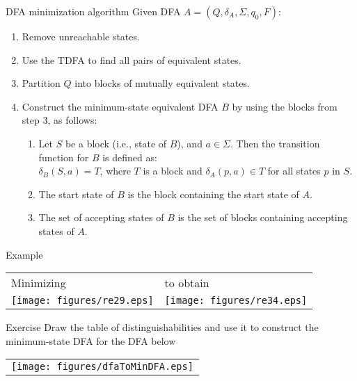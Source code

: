 \documentclass{prosper}%
\newcommand{\autom}[1]{$#1 = (Q, \delta, \Sigma, q_0, F)$}
\begin{document}
\begin{slide}{DFA minimization algorithm}
Given DFA $A=(Q, \delta_A, \Sigma, q_0, F)$:%
\begin{enumerate}
\item Remove unreachable states.
\item Use the TDFA to find all pairs of equivalent states.
\item Partition $Q$ into blocks of mutually equivalent states.
\item Construct the minimum-state equivalent DFA $B$ by using the blocks from step 3, as follows:
\begin{enumerate}
\item Let $S$ be a block (i.e., state of $B$), and $a\in\Sigma$. Then the transition function for $B$ is defined as:\\
\(
\delta_B(S,a)=T \), where $T$ is a block and $\delta_A(p,a) \in T$ for all states $p$  in $S$.
\item The start state of $B$ is the block containing the start state of $A$.
\item The set of accepting states of $B$ is the set of blocks containing accepting states of $A$.
\end{enumerate}
\end{enumerate}
\end{slide}


\begin{slide}{Example}
\begin{tabular}{l|l}
Minimizing & to obtain\\
\texttt{[image: figures/re29.eps]}
&
\texttt{[image: figures/re34.eps]}
\end{tabular}
\end{slide}




\begin{slide}{Exercise}
Draw the table of distinguishabilities  and use it to construct the minimum-state DFA for the DFA below
\begin{center}
\begin{tabular}{l}
\texttt{[image: figures/dfaToMinDFA.eps]}\\
\end{tabular}
\end{center}
\end{slide}
\end{document}
